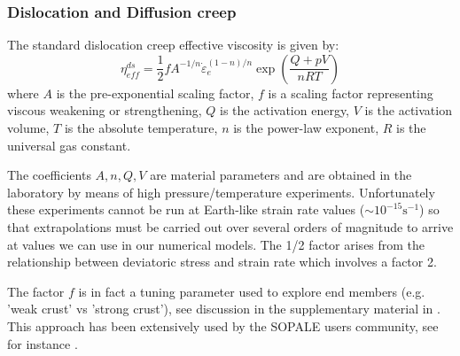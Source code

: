 \subsubsection{Dislocation and Diffusion creep}

The standard dislocation creep effective viscosity is given by:
\[
\eta_{eff}^{ds} = \frac{1}{2} f A^{-1/n} \dot{\varepsilon}_{e}^{(1-n)/n} \exp \left( \frac{Q+pV}{nRT}  \right)
\] 
where $A$ is the pre-exponential scaling factor, $f$ is a scaling factor
representing viscous weakening or strengthening, $Q$ is the activation energy, 
$V$ is the activation volume, $T$ is the absolute temperature, $n$ is the power-law 
exponent, $R$ is the universal gas constant. 

The coefficients $A,n,Q,V$ are material parameters and are obtained in the laboratory 
by means of high pressure/temperature experiments\cite{kawu93}. Unfortunately 
these experiments cannot be run at Earth-like strain rate values ($\sim 10^{-15}\text{s}^{-1}$)
so that extrapolations must be carried out over several orders of magnitude to 
arrive at values we can use in our numerical models. 
The 1/2 factor arises from the relationship between deviatoric stress and strain rate which 
involves a factor 2.

The factor $f$ is in fact a tuning parameter used to explore end members (e.g. 'weak crust' 
vs 'strong crust'), see discussion in the supplementary material in \cite{hube11}. 
This approach has been extensively used by the SOPALE users community, see 
for instance \cite{wabj08,wabj08b,wabj08c,grpy12}.

